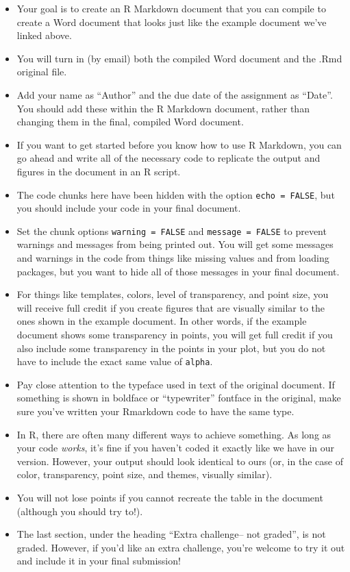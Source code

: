 \documentclass[]{book}
\providecommand{\tightlist}{%
  \setlength{\itemsep}{0pt}\setlength{\parskip}{0pt}}
\theoremstyle{definition}
\theoremstyle{definition}
\theoremstyle{definition}
\theoremstyle{remark}
\begin{document}
\begin{itemize}
\tightlist
\item
  Your goal is to create an R Markdown document that you can compile to
  create a Word document that looks just like the example document we've
  linked above.
\item
  You will turn in (by email) both the compiled Word document and the
  .Rmd original file.
\item
  Add your name as ``Author'' and the due date of the assignment as
  ``Date''. You should add these within the R Markdown document, rather
  than changing them in the final, compiled Word document.
\item
  If you want to get started before you know how to use R Markdown, you
  can go ahead and write all of the necessary code to replicate the
  output and figures in the document in an R script.
\item
  The code chunks here have been hidden with the option
  \texttt{echo\ =\ FALSE}, but you should include your code in your
  final document.
\item
  Set the chunk options \texttt{warning\ =\ FALSE} and
  \texttt{message\ =\ FALSE} to prevent warnings and messages from being
  printed out. You will get some messages and warnings in the code from
  things like missing values and from loading packages, but you want to
  hide all of those messages in your final document.
\item
  For things like templates, colors, level of transparency, and point
  size, you will receive full credit if you create figures that are
  visually similar to the ones shown in the example document. In other
  words, if the example document shows some transparency in points, you
  will get full credit if you also include some transparency in the
  points in your plot, but you do not have to include the exact same
  value of \texttt{alpha}.
\item
  Pay close attention to the typeface used in text of the original
  document. If something is shown in boldface or ``typewriter'' fontface
  in the original, make sure you've written your Rmarkdown code to have
  the same type.
\item
  In R, there are often many different ways to achieve something. As
  long as your code \emph{works}, it's fine if you haven't coded it
  exactly like we have in our version. However, your output should look
  identical to ours (or, in the case of color, transparency, point size,
  and themes, visually similar).
\item
  You will not lose points if you cannot recreate the table in the
  document (although you should try to!).
\item
  The last section, under the heading ``Extra challenge-- not graded'',
  is not graded. However, if you'd like an extra challenge, you're
  welcome to try it out and include it in your final submission!
\end{itemize}
\end{document}
